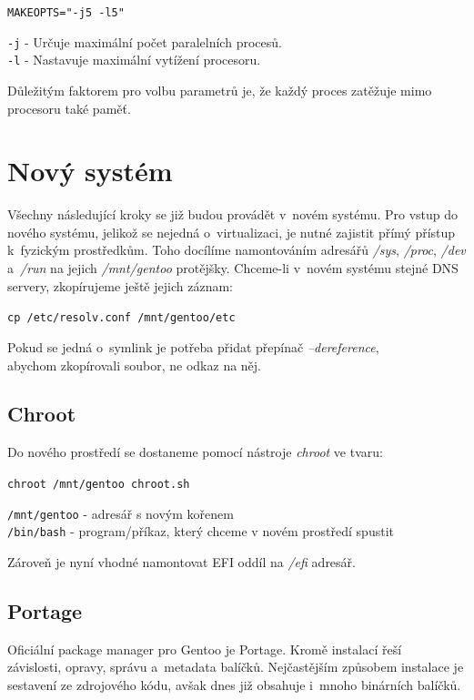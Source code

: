 \documentclass[12pt,a4paper,twoside,]{article}
\begin{document}
{{{{{{{\texttt{MAKEOPTS="-j5 -l5"}

\hspace{-1.5em}\texttt{-j} - Určuje maximální počet paralelních procesů.\\
\texttt{-l} - Nastavuje maximální vytížení procesoru.

\hspace{-1.5em}Důležitým faktorem pro volbu parametrů je, že každý proces zatěžuje mimo procesoru také paměť.

\newpage
\section{\textsf{Nový systém}}
Všechny následující kroky se již budou provádět v~novém systému.
Pro vstup do nového systému, jelikož se nejedná o~virtualizaci, je nutné zajistit přímý přístup k~fyzickým prostředkům.
Toho docílíme namontováním adresářů \textit{/sys}, \textit{/proc}, \textit{/dev} a~\textit{/run} na jejich \textit{/mnt/gentoo} protějšky. Chceme-li v~novém 
systému stejné DNS servery, zkopírujeme ještě jejich záznam: 

\texttt{cp /etc/resolv.conf /mnt/gentoo/etc} 

\hspace{-1.5em}Pokud se jedná o~symlink je potřeba přidat přepínač  \textit{--dereference}, \\
abychom zkopírovali soubor, ne odkaz na něj. 
\subsection{\textsf{Chroot}}
Do nového prostředí se dostaneme pomocí nástroje \textit{chroot} ve tvaru:

\texttt{chroot /mnt/gentoo chroot.sh}

\hspace{-1.5em}\texttt{/mnt/gentoo} - adresář s novým kořenem\\
\texttt{/bin/bash} - program/příkaz, který chceme v novém prostředí spustit

\hspace{-1.5em}Zároveň je nyní vhodné namontovat EFI oddíl na \textit{/efi} adresář.
\subsection{\textsf{Portage}}
Oficiální package manager pro Gentoo je Portage. Kromě instalací řeší \\závislosti, opravy, správu a~metadata balíčků.
Nejčastějším způsobem instalace je \\sestavení ze zdrojového kódu, avšak dnes již obsahuje i~mnoho binárních balíčků.
}}}}}}}
\end{document}

